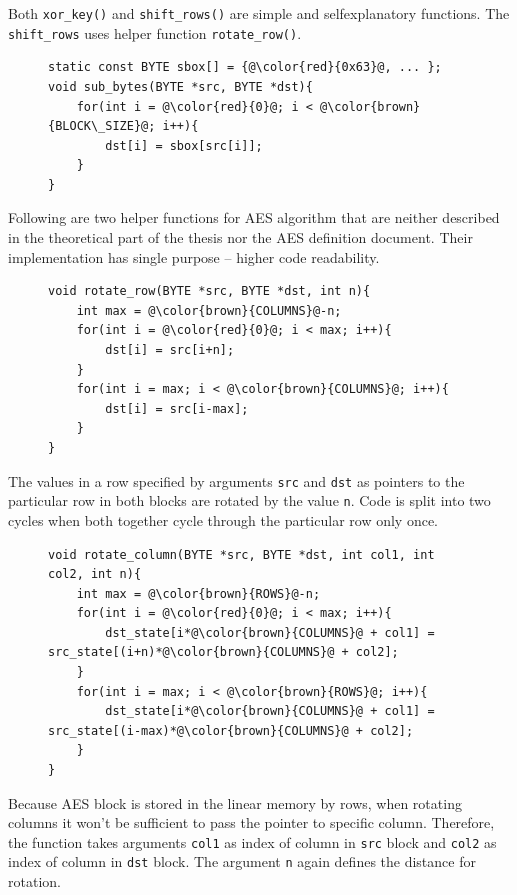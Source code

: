 Both \texttt{xor\_key()} and \texttt{shift\_rows()} are simple and selfexplanatory
functions. The \texttt{shift\_rows} uses helper function \texttt{rotate\_row()}.

\begin{figure}[H]
\begin{lstlisting}
static const BYTE sbox[] = {@\color{red}{0x63}@, ... };
void sub_bytes(BYTE *src, BYTE *dst){
    for(int i = @\color{red}{0}@; i < @\color{brown}{BLOCK\_SIZE}@; i++){
        dst[i] = sbox[src[i]];
    }
}
\end{lstlisting}
\end{figure}


Following are two helper functions for AES algorithm that are neither described 
in the theoretical part of the thesis nor the AES definition document. Their
implementation has single purpose -- higher code readability.

\begin{figure}[H]
\begin{lstlisting}
void rotate_row(BYTE *src, BYTE *dst, int n){
    int max = @\color{brown}{COLUMNS}@-n;
    for(int i = @\color{red}{0}@; i < max; i++){
        dst[i] = src[i+n];    
    }
    for(int i = max; i < @\color{brown}{COLUMNS}@; i++){
        dst[i] = src[i-max];
    }
}
\end{lstlisting}
\end{figure}

The values in a row specified by arguments \texttt{src} and \texttt{dst} as 
pointers to the particular row in both blocks are rotated by the value 
\texttt{n}. Code is split into two cycles when both together cycle through the 
particular row only once. 

\begin{figure}[H]
\begin{lstlisting}
void rotate_column(BYTE *src, BYTE *dst, int col1, int col2, int n){
    int max = @\color{brown}{ROWS}@-n;
    for(int i = @\color{red}{0}@; i < max; i++){
        dst_state[i*@\color{brown}{COLUMNS}@ + col1] = src_state[(i+n)*@\color{brown}{COLUMNS}@ + col2];
    }
    for(int i = max; i < @\color{brown}{ROWS}@; i++){
        dst_state[i*@\color{brown}{COLUMNS}@ + col1] = src_state[(i-max)*@\color{brown}{COLUMNS}@ + col2];
    }
}
\end{lstlisting}
\end{figure}

Because AES block is stored in the linear memory by rows, when rotating columns
it won't be sufficient to pass the pointer to specific column. Therefore,
the function takes arguments \texttt{col1} as index of column in \texttt{src}
block and \texttt{col2} as index of column in \texttt{dst} block. The argument
\texttt{n} again defines the distance for rotation.
 
